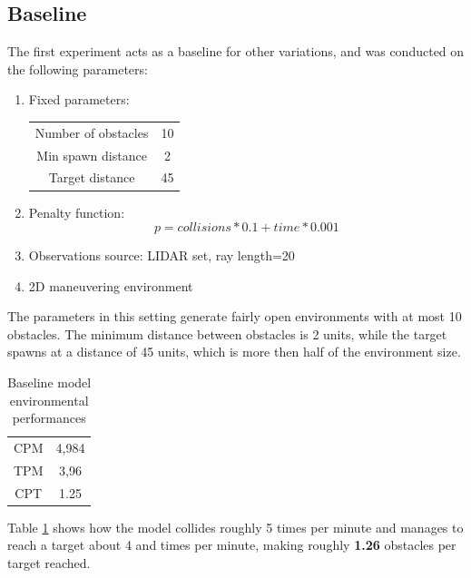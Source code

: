 \documentclass{ifacconf}
\begin{document}
\subsection{Baseline}
The first experiment acts as a baseline for other variations, and was conducted on the following parameters:
\begin{enumerate}
    \item Fixed parameters:
        \begin{table}[ht]
            \centering
            \begin{tabular}[t]{cc}
                Number of obstacles&10\\
                Min spawn distance&2\\
                Target distance&45\\
            \end{tabular}
            \end{table}%

    \item Penalty function: $$p=collisions*0.1+time*0.001$$
    \item Observations source: LIDAR set, ray length=20
    \item 2D maneuvering environment
\end{enumerate}

The parameters in this setting generate fairly open environments with at most 10 obstacles. The minimum distance between obstacles is 2 units, while the target spawns at a distance of 45 units, which is more then half of the environment size.
\begin{table}[ht]
\centering
\caption{Baseline model environmental performances}
\label{tab:baseline}
\begin{tabular}[t]{cc}
\hline
CPM&4,984\\
TPM&3,96\\
CPT&1.25\\
\hline
\end{tabular}
\end{table}%

Table \ref{tab:baseline} shows how the model collides roughly 5 times per minute and manages to reach a target about 4 and times per minute, making roughly \textbf{1.26} obstacles per target reached.
\end{document}
